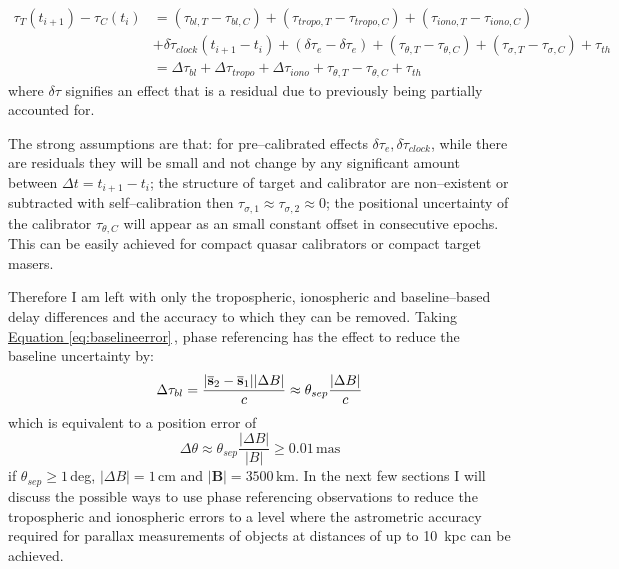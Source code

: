 		\begin{equation}
		\begin{split}
		\tau_T(t_{i+1})-\tau_C(t_{i}) &= (\tau_{bl,T}-\tau_{bl,C})+(\tau_{tropo,T}-\tau_{tropo,C})+(\tau_{iono,T}-\tau_{iono,C})\\
				&+\delta\dot{\tau}_{clock}(t_{i+1}-t_i)+(\delta\tau_e-\delta\tau_e)+(\tau_{\theta,T}-\tau_{\theta,C})+(\tau_{\sigma,T}-\tau_{\sigma,C})+\tau_{th} \\
				&= \Delta\tau_{bl}+\Delta\tau_{tropo}+\Delta\tau_{iono}+\tau_{\theta,T}-\tau_{\theta,C}+\tau_{th}
		\label{eq:phaserefequation}
		\end{split}
		\end{equation} where $\delta\tau$ signifies an effect that is a residual due to previously being partially accounted for.
	
		The strong assumptions are that: for pre--calibrated effects $\delta\tau_e,\delta\dot{\tau}_{clock}$, while there are residuals they will be small and not change by any significant amount between $\Delta t=t_{i+1}-t_i$; the structure of target and calibrator are non--existent or subtracted with self--calibration then $\tau_{\sigma,1}\approx\tau_{\sigma,2}\approx0$; the positional uncertainty of the calibrator $\tau_{\theta,C}$ will appear as an small constant offset in consecutive epochs. This can be easily achieved for compact quasar calibrators or compact target masers.
		
		Therefore I am left with only the tropospheric, ionospheric and baseline--based delay differences and the accuracy to which they can be removed. Taking \hyperref[eq:baselineerror]{Equation \ref*{eq:baselineerror}}\,, phase referencing has the effect to reduce the baseline uncertainty by:
		\begin{equation}
			\Delta\tau_{bl} = \frac{|\overline{\bf s}_2 - \overline{\bf s}_1||\Delta B|}{c}\approx \theta_{sep}\frac{|\Delta B|}{c}
		\end{equation} which is equivalent to a position error of 
		\begin{equation*}
			\Delta\theta \approx \theta_{sep}\frac{|\Delta B|}{|B|} \ge 0.01\,\text{mas}
		\end{equation*} if $\theta_{sep}\ge 1$\,deg, $|\Delta B|=1$\,cm and $|\textbf{B}|=3500$\,km. In the next few sections I will discuss the possible ways to use phase referencing observations to reduce the tropospheric and ionospheric errors to a level where the astrometric accuracy required for parallax measurements of objects at distances of up to 10~kpc can be achieved. 
		
